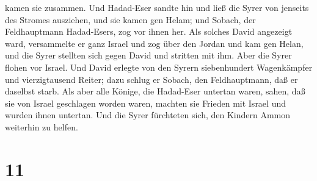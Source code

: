 kamen sie zusammen.  Und Hadad-Eser sandte hin und ließ
die Syrer von jenseits des Stromes ausziehen, und sie kamen gen Helam;
und Sobach, der Feldhauptmann Hadad-Esers, zog vor ihnen her.
 Als solches David angezeigt ward, versammelte er ganz
Israel und zog über den Jordan und kam gen Helan, und die Syrer stellten
sich gegen David und stritten mit ihm.  Aber die Syrer
flohen vor Israel. Und David erlegte von den Syrern siebenhundert
Wagenkämpfer und vierzigtausend Reiter; dazu schlug er Sobach, den
Feldhauptmann, daß er daselbst starb.  Als aber alle
Könige, die Hadad-Eser untertan waren, sahen, daß sie von Israel
geschlagen worden waren, machten sie Frieden mit Israel und wurden ihnen
untertan. Und die Syrer fürchteten sich, den Kindern Ammon weiterhin zu
helfen.

\hypertarget{section-10}{%
\section{11}\label{section-10}}

